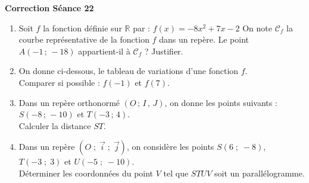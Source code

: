 \documentclass[a4paper,11pt]{article}
\begin{document}
\vspace{0.5cm}
\begin{center}

\textbf{\textcolor{Couleur8}{Correction Séance 22}}\\
\vspace{2mm}

\end{center}


\begin{seanceD}{} %

\begin{enumerate}
\item  Soit $f$ la fonction définie sur $\mathbb{R}$ par :
$f(x)=-8x^2+7x-2$
              On note $\mathscr{C}_f$ la courbe représentative de la fonction $f$ dans un repère.
              Le point $A(-1\,;\, -18)$ appartient-il à $\mathscr{C}_f$ ? Justifier.

\bigskip

\dotfill

\item On donne ci-dessous, le tableau de variations d'une fonction $f$. \\
 Comparer si possible : $f(-1)$ et $f(7)$.

\medskip
\begin{center}
\end{center}

\item    Dans un repère orthonormé $(O\,;\,I\,,\,J)$, on donne les points suivants : $S\left(-8\,;\,-10\right)$ et $T\left(-3\,;\,4\right)$. \\Calculer la distance $ST$.

\bigskip

\dotfill

\bigskip

\dotfill

\item   Dans un repère $(O\;;\;\vec{i}\;;\;\vec{j})$, on considère les points $S(6\;;\;-8)$, $T(-3\;;\;3)$ et $U(-5\;;\;-10)$.\\Déterminer les coordonnées du point $V$ tel que $STUV$ soit un parallélogramme.\dotfill


\end{enumerate}
\end{seanceD}
\end{document}

